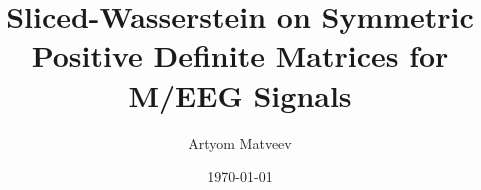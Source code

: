 \documentclass{beamer}
\title[Week 3]{Sliced-Wasserstein on Symmetric Positive Definite Matrices for M/EEG Signals} %
\author{Artyom Matveev} %
\institute[MIPT] %
{
Moscow Institute of Physics and Technology \\ %
\medskip
\textit{matveev.as@phystech.edu} %
}
\date{\today} %
\begin{document}
{
\begin{frame}
\titlepage %
\end{frame}
}



%
\end{document}
